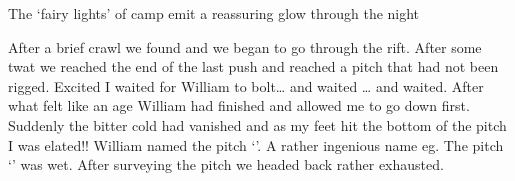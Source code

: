 \begin{marginfigure}
\centering
  \caption{The `fairy lights' of camp \protect{} emit a reassuring glow through the night }
\end{marginfigure}

After a brief crawl we found   and we began to go through the rift. After some twat we reached the end of the last push and reached a pitch that had not been rigged. Excited I waited for William to bolt… and waited … and waited. After what felt like an age William had finished and allowed me to go down first. Suddenly the bitter cold had vanished and as my feet hit the bottom of the pitch I was elated!! William named the pitch `'. A rather ingenious name eg. The pitch `' was wet. After surveying the pitch we headed back rather exhausted. 



